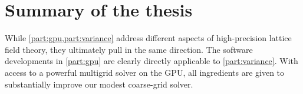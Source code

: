 \chapter{Summary of the thesis}
\label{ch:summary}





While \cref{part:gpu,part:variance} address different aspects of high-precision lattice field theory, they ultimately pull in the same direction.
The software developments in \cref{part:gpu} are clearly directly applicable to \cref{part:variance}.
With access to a powerful multigrid solver on the GPU, all ingredients are given to substantially improve our modest coarse-grid solver.

